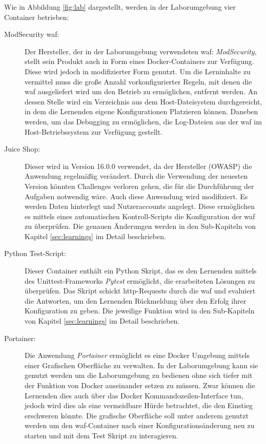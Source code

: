 Wie in Abbildung \ref{fig:lab} dargestellt, werden in der Laborumgebung vier Container betrieben:

\begin{description}
    \item[ModSecurity \ac{waf}:] Der Hersteller, der in der Laborumgebung verwendeten \ac{waf}: \textit{ModSecurity}, stellt sein Produkt auch in Form eines Docker-Containers zur Verfügung. 
    Diese wird jedoch in modifizierter Form genutzt.
    Um die Lerninhalte zu vermittel muss die große Anzahl vorkonfigurierter Regeln, mit denen die \ac{waf} ausgeliefert wird um den Betrieb zu ermöglichen, entfernt werden.
    An dessen Stelle wird ein Verzeichnis aus dem Host-Dateisystem durchgereicht, in dem die Lernenden eigene Konfigurationen Platzieren können.
    Daneben werden, um das Debugging zu ermöglichen, die Log-Dateien aus der \ac{waf} im Host-Betriebssystem zur Verfügung gestellt.
    
    \item[Juice Shop:] Dieser wird in Version 16.0.0 verwendet, da der Hersteller (OWASP) die Anwendung regelmäßig verändert.
    Durch die Verwendung der neuesten Version könnten Challenges verloren gehen, die für die Durchführung der Aufgaben notwendig wäre.
    Auch diese Anwendung wird modifiziert.
    Es werden Daten hinterlegt und Nutzeraccounts angelegt.
    Diese ermöglichen es mittels eines automatischen Kontroll-Scripts die Konfiguration der \ac{waf} zu überprüfen.
    Die genauen Änderungen werden in den Sub-Kapiteln von Kapitel \ref{sec:learnings} im Detail beschrieben.

    \item[Python Test-Script:] Dieser Container enthält ein Python Skript, das es den Lernenden mittels des Unittest-Frameworks \textit{Pytest} ermöglicht, die erarbeiteten Lösungen zu überprüfen.
    Das Skript schickt \ac{http}-Requests durch die \ac{waf} und evaluiert die Antworten, um den Lernenden Rückmeldung über den Erfolg ihrer Konfiguration zu geben.
    Die jeweilige Funktion wird in den Sub-Kapiteln von Kapitel \ref{sec:learnings} im Detail beschrieben.

    \item[Portainer:] Die Anwendung \textit{Portainer} ermöglicht es eine Docker Umgebung mittels einer Grafischen Oberfläche zu verwalten.
    In der Laborumgebung kann sie genutzt werden um die Laborumgebung zu bedienen ohne sich tiefer mit der Funktion von Docker auseinander setzen zu müssen.
    Zwar können die Lernenden dies auch über das Docker Kommandozeilen-Interface tun, jedoch wird dies als eine vermeidbare Hürde betrachtet, die den Einstieg erschweren könnte.
    Die grafische Oberfläche soll unter anderem genutzt werden um den \ac{waf}-Container nach einer Konfigurationsänderung neu zu starten und mit dem Test Skript zu interagieren. 
\end{description}

